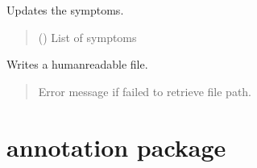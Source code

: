 \documentclass[letterpaper,10pt,english]{sphinxmanual}
\begin{document}
\begin{fulllineitems}
\begin{fulllineitems}
\begin{quote}
\begin{description}
\end{description}\end{quote}

\end{fulllineitems}


\begin{fulllineitems}
\label{\detokenize{frise:frise.save.save.set_symptomes}}
\pysigstartsignatures
{}
\pysigstopsignatures
\sphinxAtStartPar
Updates the symptoms.
\begin{quote}\begin{description}
\sphinxAtStartPar
{} () \textendash{} List of symptoms

\end{description}\end{quote}

\end{fulllineitems}


\begin{fulllineitems}
\label{\detokenize{frise:frise.save.save.write_report}}
\pysigstartsignatures
{}
\pysigstopsignatures
\sphinxAtStartPar
Writes a human\sphinxhyphen{}readable file.
\begin{quote}\begin{description}
\sphinxAtStartPar
{} \textendash{} Error message if failed to retrieve file path.

\end{description}\end{quote}

\end{fulllineitems}


\end{fulllineitems}


\sphinxstepscope


\chapter{annotation package}
\label{\detokenize{annotation:annotation-package}}\label{\detokenize{annotation::doc}}
\end{document}

